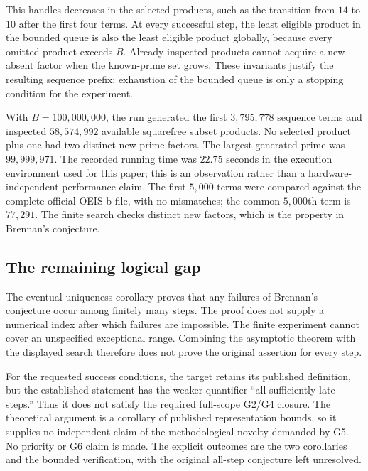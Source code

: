 \documentclass[11pt,a4paper]{article}
\theoremstyle{definition}\newtheorem{definition}[theorem]{Definition}
\theoremstyle{remark}\newtheorem{remark}[theorem]{Remark}
\begin{document}
This handles decreases in the selected products, such as the transition
from $14$ to $10$ after the first four terms.  At every successful step,
the least eligible product in the bounded queue is also the least
eligible product globally, because every omitted product exceeds $B$.
Already inspected products cannot acquire a new absent factor when the
known-prime set grows.  These invariants justify the resulting sequence
prefix; exhaustion of the bounded queue is only a stopping condition for
the experiment.

With $B=100{,}000{,}000$, the run generated the first $3{,}795{,}778$
sequence terms and inspected $58{,}574{,}992$ available squarefree subset products.
No selected product plus one had two distinct new prime factors.  The
largest generated prime was $99{,}999{,}971$.  The recorded running time
was $22.75$ seconds in the execution environment used for this paper;
this is an observation rather than a hardware-independent performance
claim.  The first $5{,}000$ terms were compared against the complete
official OEIS b-file, with no mismatches; the common $5{,}000$th term is
$77{,}291$.  The finite search checks distinct new factors, which is the
property in Brennan's conjecture.

\subsection{The remaining logical gap}

The eventual-uniqueness corollary proves that any failures of Brennan's conjecture occur among
finitely many steps.  The proof does not supply a numerical index after
which failures are impossible.  The finite experiment cannot cover an
unspecified exceptional range.  Combining the asymptotic theorem with
the displayed search therefore does not prove the original assertion
for every step.

For the requested success conditions, the target retains its published
definition, but the established statement has the weaker quantifier
``all sufficiently late steps.''  Thus it does not satisfy the required
full-scope G2/G4 closure.  The theoretical argument is a corollary of
published representation bounds, so it supplies no independent claim
of the methodological novelty demanded by G5.  No priority or G6 claim
is made.  The explicit outcomes are the two corollaries and the bounded
verification, with the original all-step conjecture left unresolved.
\end{document}
